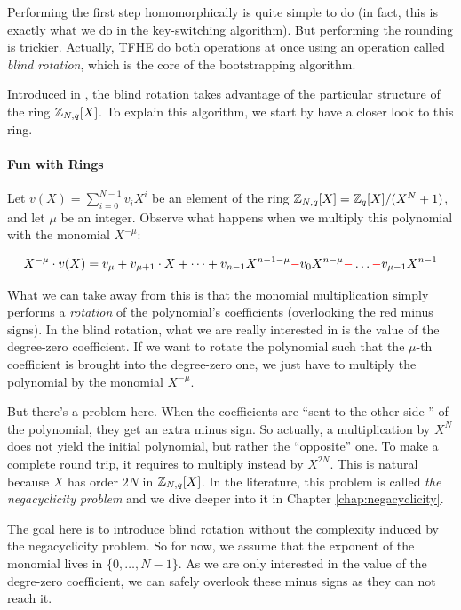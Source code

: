 Performing the first step homomorphically is quite simple to do (in fact, this is exactly what we do in the key-switching algorithm). But performing the rounding is trickier. Actually, TFHE do both operations at once using an operation called \textit{blind rotation}, which is the core of the bootstrapping algorithm. 

Introduced in \cite{EC:DucMic15}, the blind rotation takes advantage of the particular structure of the ring $\mathbb{Z}_{N,q}[X]$. To explain this algorithm, we start by have a closer look to this ring.




\paragraph{Fun with Rings}

Let $v(X) = \displaystyle \sum_{i=0}^{N-1} v_i X^i$ be an element of the ring $\mathbb{Z}_{N,q}[X] = \mathbb{Z}_q[X] / (X^N + 1)$, and let $\mu$ be an integer. Observe what happens when we multiply this polynomial with the monomial $X^{-\mu}$:

\begin{equation*}
	X^{-\mu} \cdot v(X) = v_\mu + v_{\mu + 1} \cdot X + \dots + v_{n-1} X^{n-1-\mu} \textcolor{red}{-} v_0 X^{n - \mu} \textcolor{red}{-} \dots \textcolor{red}{-} v_{\mu - 1} X^{n-1}
\end{equation*}

What we can take away from this is that the monomial multiplication simply performs a \textit{rotation} of the polynomial's coefficients (overlooking the red minus signs). In the blind rotation, what we are really interested in is the value of the degree-zero coefficient. If we want to rotate the polynomial such that the $\mu$-th coefficient is brought into the degree-zero one, we just have to multiply the polynomial by the monomial $X^{-\mu}$.

But there's a problem here. When the coefficients are ``sent to the other side '' of the polynomial, they get an extra minus sign. So actually, a multiplication by $X^N$ does not yield the initial polynomial, but rather the ``opposite'' one. To make a complete round trip, it requires to multiply instead by $X^{2N}$. This is natural because $X$ has order $2N$ in $\mathbb{Z}_{N,q}[X]$. In the literature, this problem is called \textit{the negacyclicity problem} and we dive deeper into it in Chapter \ref{chap:negacyclicity}.

The goal here is to introduce blind rotation without the complexity induced by the negacyclicity problem. So for now, we assume that the exponent of the monomial lives in $\lbrace 0, \dots, N-1 \rbrace$. As we are only interested in the value of the degre-zero coefficient, we can safely overlook these minus signs as they can not reach it.

